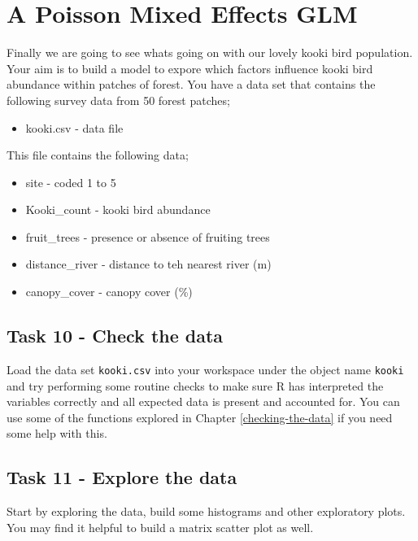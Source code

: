 \documentclass[
]{book}
\providecommand{\tightlist}{%
  \setlength{\itemsep}{0pt}\setlength{\parskip}{0pt}}
\begin{document}
\section{A Poisson Mixed Effects GLM}\label{a-poisson-mixed-effects-glm}

Finally we are going to see whats going on with our lovely kooki bird population. Your aim is to build a model to expore which factors influence kooki bird abundance within patches of forest. You have a data set that contains the following survey data from 50 forest patches;

\begin{itemize}
\tightlist
\item
  kooki.csv - data file
\end{itemize}

This file contains the following data;

\begin{itemize}
\tightlist
\item
  site - coded 1 to 5
\item
  Kooki\_count - kooki bird abundance
\item
  fruit\_trees - presence or absence of fruiting trees
\item
  distance\_river - distance to teh nearest river (m)
\item
  canopy\_cover - canopy cover (\%)
\end{itemize}

\subsection{Task 10 - Check the data}\label{task-10---check-the-data}

Load the data set \texttt{kooki.csv} into your workspace under the object name \texttt{kooki} and try performing some routine checks to make sure R has interpreted the variables correctly and all expected data is present and accounted for. You can use some of the functions explored in Chapter \ref{checking-the-data} if you need some help with this.

\subsection{Task 11 - Explore the data}\label{task-11---explore-the-data}

Start by exploring the data, build some histograms and other exploratory plots. You may find it helpful to build a matrix scatter plot as well.
\end{document}
